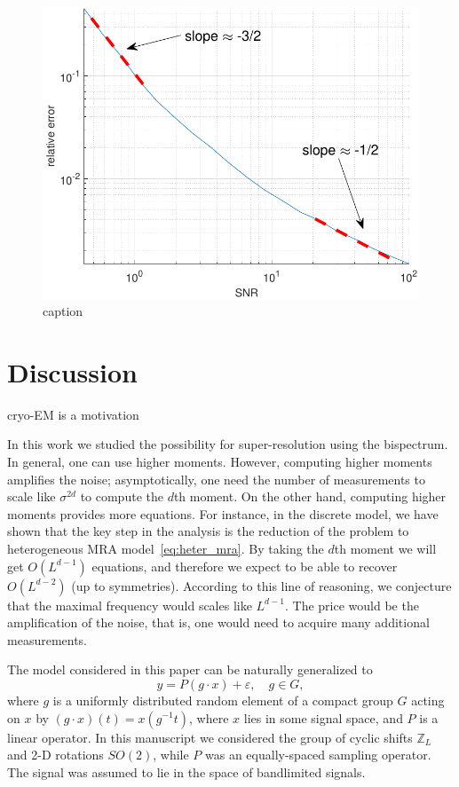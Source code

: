 \documentclass[english,12pt]{article}
\newcommand{\TODO}[1]{{\color{red}{[#1]}}}
\numberwithin{equation}{section}
\numberwithin{thm}{section} %
\begin{document}
\begin{figure}[h]
	\centering
	  \includegraphics[scale=1]{XP1}
	  \caption{\label{fig:XP1} caption}	
\end{figure}



\section{Discussion} \label{sec:future_work}


cryo-EM is a motivation~\cite{chen2018single}


In this work we studied the possibility for super-resolution using the bispectrum. In general, one can use higher moments. However, computing higher moments amplifies the noise; asymptotically, one need the number of measurements to scale like $\sigma^{2d}$ to compute the $d$th moment. On the other hand, computing higher moments provides more equations. For instance, in the discrete model, we have shown that the key step in the analysis is the reduction of the problem to heterogeneous MRA model~\eqref{eq:heter_mra}.  By taking the $d$th moment we will get  $O(L^{d-1})$ equations, and therefore we expect to be able to recover $O(L^{d-2})$ (up to symmetries). According to this line of reasoning, we conjecture that the maximal frequency would scales like $L^{d-1}$. The price would be the amplification of the noise, that is, one would need to acquire many additional measurements.  

The model considered in this paper can be naturally generalized to 
\begin{equation} \label{eq:general_model}
y = P (g\cdot x) + \varepsilon,\quad g\in G,
\end{equation}
where $g$ is a uniformly distributed random element of a compact group $G$ acting on $x$ by $(g\cdot x)(t) = x(g^{-1}t)$, where $x$ lies in some signal space, and $P$ is a linear operator.  In this manuscript we considered the group of cyclic shifts $\mathbb{Z}_L$ and 2-D rotations $SO(2)$, while $P$ was an equally-spaced sampling operator. The signal was assumed to lie in the space of bandlimited signals.  \TODO{Refs to papers on bispectrum for general groups}
\end{document}
